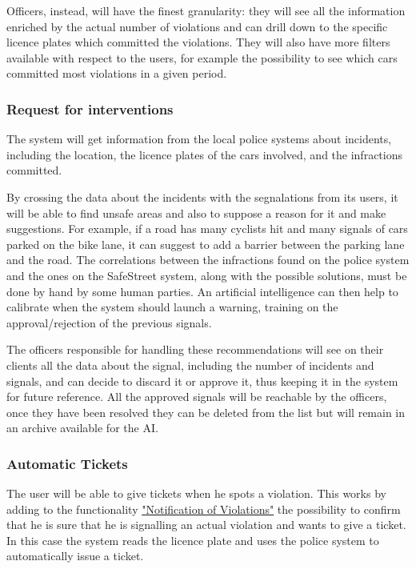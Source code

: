 Officers, instead, will have the finest granularity: they will see all the information enriched by the actual number of violations and can drill down to the specific licence plates which committed the violations.
They will also have more filters available with respect to the users, for example the possibility to see which cars committed most violations in a given period.

\subsubsection{Request for interventions}
\label{sec:request_for_interventions}
The system will get information from the local police systems about incidents, including the location, the licence plates of the cars involved, and the infractions committed.

By crossing the data about the incidents with the segnalations from its users, it will be able to find unsafe areas and also to suppose a reason for it and make suggestions.
For example, if a road has many cyclists hit and many signals of cars parked on the bike lane, it can suggest to add a barrier between the parking lane and the road.
The correlations between the infractions found on the police system and the ones on the SafeStreet system, along with the possible solutions, must be done by hand by some human parties.
An artificial intelligence can then help to calibrate when the system should launch a warning, training on the approval/rejection of the previous signals.

The officers responsible for handling these recommendations will see on their clients all the data about the signal,
including the number of incidents and signals, and can decide to discard it or approve it, thus keeping it in the system for future reference.
All the approved signals will be reachable by the officers, once they have been resolved they can be deleted from the list but will remain in an archive available for the AI.


\subsubsection{Automatic Tickets}
\label{sec:automatic_tickets}
The user will be able to give tickets when he spots a violation. This works by adding to the functionality
\hyperref[sec:notification_of_violations]{"Notification of Violations"}
the possibility to confirm that he is sure that he is signalling an actual violation and wants to give a ticket.
In this case the system reads the licence plate and uses the police system to automatically issue a ticket.


